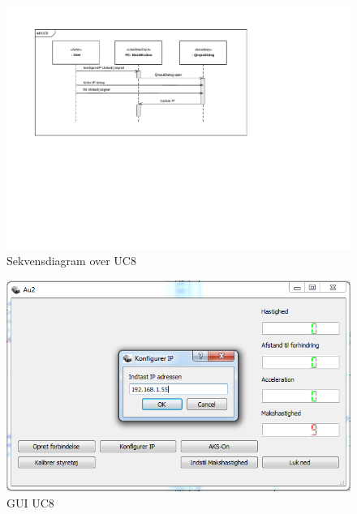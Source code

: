 \begin{figure}[H]
\centering
\includegraphics[width=\textwidth* 2/3,height=\textwidth* 4/10 ]{../fig/diagrammer/pc/sd_uc8.pdf}
\caption{Sekvensdiagram over UC8}
\label{fig:cd_uc8}
\end{figure}

\begin{figure}[H]
\centering
\includegraphics[width=\textwidth* 3/4,height=\textwidth* 9/20 ]{../fig/billeder/gui_uc8.png}
\caption{GUI UC8}
\label{fig:GUI_uc8}
\end{figure}


